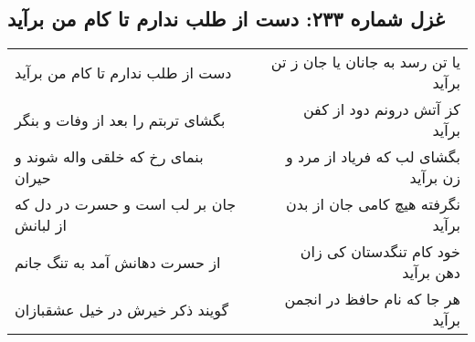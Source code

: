 \begin{center}
\section*{غزل شماره ۲۳۳: دست از طلب ندارم تا کام من برآید}
\label{sec:sh233}
\begin{longtable}{l p{0.5cm} r}
دست از طلب ندارم تا کام من برآید
&&
یا تن رسد به جانان یا جان ز تن برآید
\\
بگشای تربتم را بعد از وفات و بنگر
&&
کز آتش درونم دود از کفن برآید
\\
بنمای رخ که خلقی واله شوند و حیران
&&
بگشای لب که فریاد از مرد و زن برآید
\\
جان بر لب است و حسرت در دل که از لبانش
&&
نگرفته هیچ کامی جان از بدن برآید
\\
از حسرت دهانش آمد به تنگ جانم
&&
خود کام تنگدستان کی زان دهن برآید
\\
گویند ذکر خیرش در خیل عشقبازان
&&
هر جا که نام حافظ در انجمن برآید
\\
\end{longtable}
\end{center}
